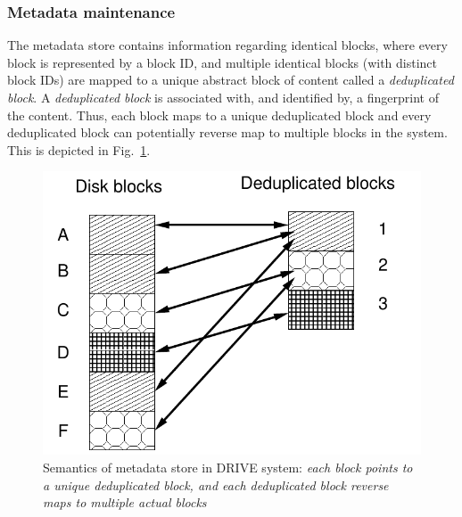 \subsubsection{Metadata maintenance}
The metadata store contains information regarding identical blocks,
where every block is represented by a block ID, and multiple identical
blocks (with distinct block IDs) are mapped to a unique abstract block
of content called a \textit{deduplicated block}.
A \textit{deduplicated block} is
associated with, and identified by, a fingerprint of the content.
Thus, each block maps to a unique deduplicated block and every
deduplicated block can potentially reverse map to multiple blocks
in the system. This is depicted in Fig.~\ref{fig:deduped-block}.

\begin{figure}
    \centering
    \includegraphics[scale=0.6]{confided-figures/main/deduped-block.pdf}
    \caption{Semantics of metadata store in DRIVE system: \textit{each block points to a unique deduplicated block, and each deduplicated block reverse maps to multiple actual blocks}}
    \label{fig:deduped-block}
\end{figure}

